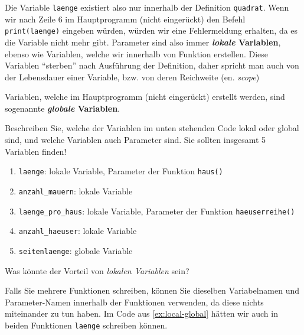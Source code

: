 Die Variable \texttt{laenge} existiert also nur innerhalb der Definition \lstinline|quadrat|. Wenn wir nach Zeile 6 im Hauptprogramm (nicht eingerückt) den Befehl \texttt{print(laenge)} eingeben würden, würden wir eine Fehlermeldung erhalten, da es die Variable nicht mehr gibt. Parameter sind also immer \textbf{\textit{lokale} Variablen}, ebenso wie Variablen, welche wir innerhalb von Funktion erstellen. Diese Variablen \enquote{sterben} nach Ausführung der Definition, daher spricht man auch von der Lebensdauer einer Variable, bzw. von deren Reichweite (en. \textit{scope})

Variablen, welche im Hauptprogramm (nicht eingerückt) erstellt werden, sind sogenannte \textbf{\textit{globale} Variablen}.

\begin{myexercise}\label{ex:local-global}
	Beschreiben Sie, welche der Variablen im unten stehenden Code lokal oder global sind, und welche Variablen auch Parameter sind. Sie sollten insgesamt 5 Variablen finden!
	

	\begin{myanswer}
		\begin{enumerate}
			\item \lstinline|laenge|: lokale Variable, Parameter der Funktion \lstinline|haus()|
			\item \lstinline|anzahl_mauern|: lokale Variable
			\item \lstinline|laenge_pro_haus|: lokale Variable, Parameter der Funktion \lstinline|haeuserreihe()|
			\item \lstinline|anzahl_haeuser|: lokale Variable
			\item \lstinline|seitenlaenge|: globale Variable
		\end{enumerate}
	\end{myanswer}
\end{myexercise}

\begin{myexercise}
	Was könnte der Vorteil von \textit{lokalen Variablen} sein?
	\begin{myanswer}
		Falls Sie mehrere Funktionen schreiben, können Sie dieselben Variabelnamen und Parameter-Namen innerhalb der Funktionen verwenden, da diese nichts miteinander zu tun haben. Im Code aus \cref{ex:local-global} hätten wir auch in beiden Funktionen \texttt{laenge} schreiben können.
	\end{myanswer}
\end{myexercise}


